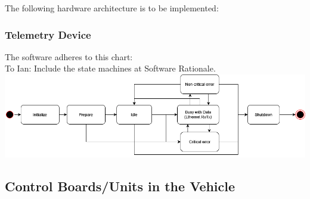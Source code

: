 The following hardware architecture is to be implemented:

\subsubsection{Telemetry Device}
The software adheres to this chart: \\
To Ian: Include the state machines at Software Rationale.
\includegraphics[width=\textwidth]{texfiles/elec/eimg/telemetrystate.png}

\subsection{Control Boards/Units in the Vehicle}

